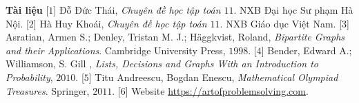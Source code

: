 \begin{multicols}{2}
	\vskip 0.1cm
	\textbf{\color{hoccungpi}Tài liệu}
	\vskip 0.1cm
	[$1$] Đỗ Đức Thái, \textit{Chuyên đề học tập toán $11$}. NXB Đại học Sư phạm Hà Nội. 
	\vskip 0.1cm
	[$2$] Hà Huy Khoái, \textit{Chuyên đề học tập toán $11$}. NXB Giáo dục Việt Nam. 
	\vskip 0.1cm
	[$3$] Asratian, Armen S.; Denley, Tristan M. J.; Häggkvist, Roland, \textit{Bipartite Graphs and their Applications}. Cambridge University Press, $1998$.
	\vskip 0.1cm
	[$4$] Bender, Edward A.; Williamson, S. Gill , \textit{Lists, Decisions and Graphs  With an Introduction to Probability}, $2010$.
	\vskip 0.1cm
	[$5$] Titu Andreescu, Bogdan Enescu, \textit{Mathematical Olympiad Treasures}. Springer, $2011$.
	\vskip 0.1cm                 
	[$6$] Website \url{https://artofproblemsolving.com}. 
\end{multicols}